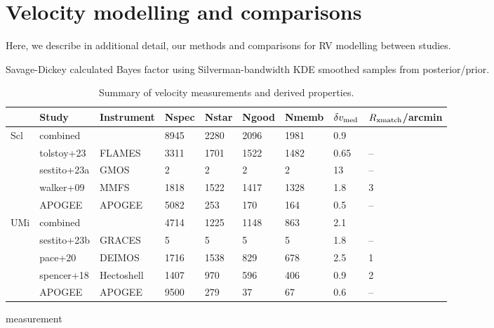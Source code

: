 \section{Velocity modelling and
comparisons}\label{velocity-modelling-and-comparisons}

Here, we describe in additional detail, our methods and comparisons for
RV modelling between studies.

Savage-Dickey calculated Bayes factor using Silverman-bandwidth KDE
smoothed samples from posterior/prior.

\begin{table*}[t]
\centering
\caption[Spectroscopic LOS velocity measurements]{Summary of velocity measurements and derived properties. }
\label{tab:rv_measurements}
\begin{tabular}{lllllllll}
\toprule
 & Study & Instrument & Nspec & Nstar & Ngood & Nmemb & $\delta v_{\rm med}$ & $R_{\rm xmatch}$/arcmin\\
\midrule
Scl & combined &  & 8945 & 2280 & 2096 & 1981 & 0.9 & \\
 & tolstoy+23 & FLAMES & 3311 & 1701 & 1522 & 1482 & 0.65 & –\\
 & sestito+23a & GMOS & 2 & 2 & 2 & 2 & 13 & –\\
 & walker+09 & MMFS & 1818 & 1522 & 1417 & 1328 & 1.8 & 3\\
 & APOGEE & APOGEE & 5082 & 253 & 170 & 164 & 0.5 & –\\
UMi & combined &  & 4714 & 1225 & 1148 & 863 & 2.1 & \\
 & sestito+23b & GRACES & 5 & 5 & 5 & 5 & 1.8 & –\\
 & pace+20 & DEIMOS & 1716 & 1538 & 829 & 678 & 2.5 & 1\\
 & spencer+18 & Hectoshell & 1407 & 970 & 596 & 406 & 0.9 & 2\\
 & APOGEE & APOGEE & 9500 & 279 & 37 & 67 & 0.6 & –\\
\bottomrule
\end{tabular}
\end{table*}

measurement

